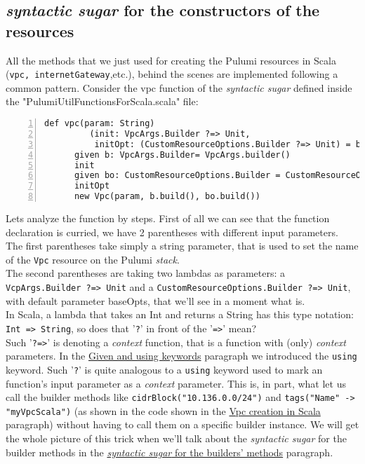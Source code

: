 \subsection{\textit{syntactic sugar} for the constructors of the resources}
All the methods that we just used for creating the Pulumi resources in Scala (\texttt{vpc, internetGateway},etc.), behind the scenes are implemented following a common pattern.
Consider the vpc function of the \textit{syntactic sugar} defined inside the "PulumiUtilFunctionsForScala.scala" file:\\
\begin{minipage}{\linewidth}
\begin{lstlisting}[numbers=left, numberstyle=\tiny, numbersep=-5pt, stepnumber=1]
  def vpc(param: String)
         (init: VpcArgs.Builder ?=> Unit,
          initOpt: (CustomResourceOptions.Builder ?=> Unit) = baseOpts): Vpc =
	  given b: VpcArgs.Builder= VpcArgs.builder()
	  init
	  given bo: CustomResourceOptions.Builder = CustomResourceOptions.builder()
	  initOpt
	  new Vpc(param, b.build(), bo.build())
\end{lstlisting}
\end{minipage}
Lets analyze the function by steps.
First of all we can see that the function declaration is curried, we have 2 parentheses with different input parameters.\\
The first parentheses take simply a string parameter, that is used to set the name of the \texttt{Vpc} resource on the Pulumi \textit{stack}.\\
The second parentheses are taking two lambdas as parameters: a \texttt{VcpArgs.Builder ?=> Unit}  and a \texttt{CustomResourceOptions.Builder ?=> Unit}, with default parameter baseOpts, that we'll see in a moment what is.\\
In Scala, a lambda that takes an Int and returns a String has this type notation: \texttt{Int => String}, so does that '\texttt{?}' in front of the '\texttt{=>}' mean?\\
Such '\texttt{?=>}' is denoting a \textit{context} function, that is a function with (only) \textit{context} parameters.
In the \hyperref[par:given-using]{Given and using keywords} paragraph we introduced the \texttt{using} keyword.
Such '\texttt{?}' is quite analogous to a \texttt{using} keyword used to mark an function's input parameter as a \textit{context} parameter.
This is, in part, what let us call the builder methods like \texttt{cidrBlock("10.136.0.0/24")} and \texttt{tags("Name" -> "myVpcScala")} (as shown in the code shown in the \hyperref[sssec:vpc-creation-scala]{Vpc creation in Scala} paragraph)
without having to call them on a specific builder instance.
We will get the whole picture of this trick when we'll talk about the \textit{syntactic sugar} for the builder methods in the \hyperref[ssec:syn-sug-builders]{\textit{syntactic sugar} for the builders' methods} paragraph.

